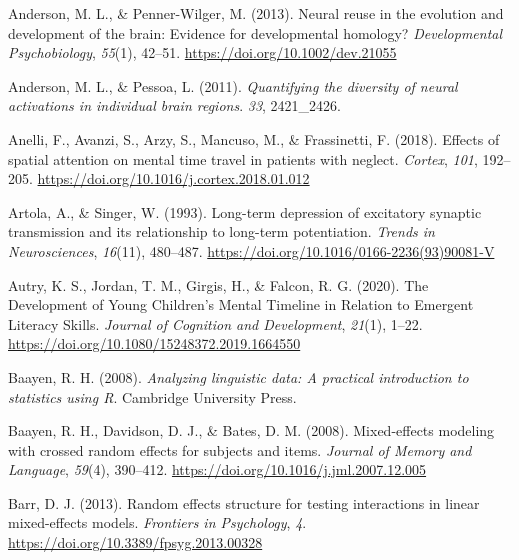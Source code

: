 \documentclass[
  a4paper,12pt,twoside,onecolumn,openright,final,oldfontcommands]{memoir}
\newlength{\cslhangindent}
\newlength{\cslentryspacingunit} %
\newenvironment{CSLReferences}[2] %
 {%
  \setlength{\parindent}{0pt}
  \ifodd #1
  \let\oldpar\par
  \def\par{\hangindent=\cslhangindent\oldpar}
  \fi
  \setlength{\parskip}{#2\cslentryspacingunit}
 }%
 {}
\begin{document}
\begin{CSLReferences}{1}{0}
\leavevmode{}%
Anderson, M. L., \& Penner-Wilger, M. (2013). Neural reuse in the evolution and development of the brain: {Evidence} for developmental homology? \emph{Developmental Psychobiology}, \emph{55}(1), 42--51. \url{https://doi.org/10.1002/dev.21055}

\leavevmode{}%
Anderson, M. L., \& Pessoa, L. (2011). \emph{Quantifying the diversity of neural activations in individual brain regions}. \emph{33}, 2421\_2426.

\leavevmode{}%
Anelli, F., Avanzi, S., Arzy, S., Mancuso, M., \& Frassinetti, F. (2018). Effects of spatial attention on mental time travel in patients with neglect. \emph{Cortex}, \emph{101}, 192--205. \url{https://doi.org/10.1016/j.cortex.2018.01.012}

\leavevmode{}%
Artola, A., \& Singer, W. (1993). Long-term depression of excitatory synaptic transmission and its relationship to long-term potentiation. \emph{Trends in Neurosciences}, \emph{16}(11), 480--487. \url{https://doi.org/10.1016/0166-2236(93)90081-V}

\leavevmode{}%
Autry, K. S., Jordan, T. M., Girgis, H., \& Falcon, R. G. (2020). The {Development} of {Young} {Children}'s {Mental} {Timeline} in {Relation} to {Emergent} {Literacy} {Skills}. \emph{Journal of Cognition and Development}, \emph{21}(1), 1--22. \url{https://doi.org/10.1080/15248372.2019.1664550}

\leavevmode{}%
Baayen, R. H. (2008). \emph{Analyzing linguistic data: A practical introduction to statistics using {R}}. Cambridge University Press.

\leavevmode{}%
Baayen, R. H., Davidson, D. J., \& Bates, D. M. (2008). Mixed-effects modeling with crossed random effects for subjects and items. \emph{Journal of Memory and Language}, \emph{59}(4), 390--412. \url{https://doi.org/10.1016/j.jml.2007.12.005}

\leavevmode{}%
Barr, D. J. (2013). Random effects structure for testing interactions in linear mixed-effects models. \emph{Frontiers in Psychology}, \emph{4}. \url{https://doi.org/10.3389/fpsyg.2013.00328}


\end{CSLReferences}
\end{document}
